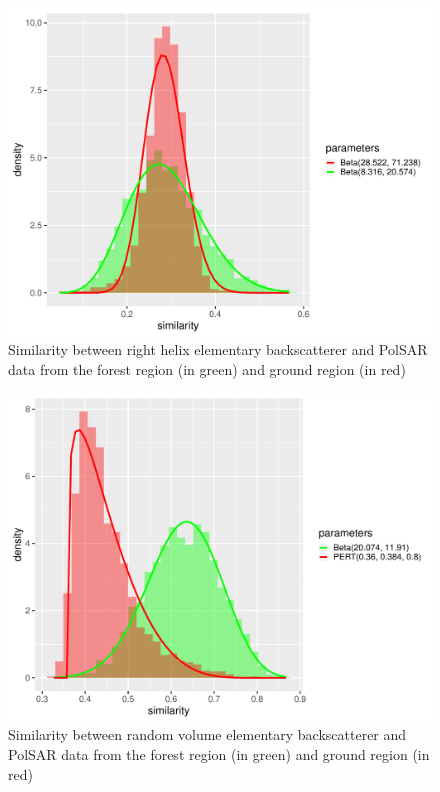 \documentclass[conference]{IEEEtran}
\begin{document}
\begin{figure}[!ht]
    \centering
    \includegraphics[width = .9\linewidth, height = .7\linewidth]{../../../Figures/paper_19_05/rh.pdf}
    \caption{Similarity between right helix elementary backscatterer and PolSAR data from the forest region (in green) and ground region (in red)}
    \label{fig:rh}
\end{figure}

\begin{figure}[!ht]
    \centering
    \includegraphics[width = .9\linewidth, height = .7\linewidth]{../../../Figures/paper_19_05/rv.pdf}
    \caption{Similarity between random volume elementary backscatterer and PolSAR data from the forest region (in green) and ground region (in red)}
    \label{fig:rv}
\end{figure}
\end{document}
